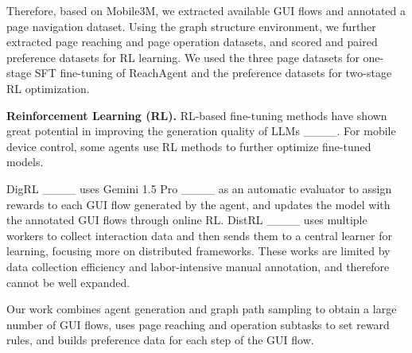 Therefore, based on Mobile3M, we extracted available GUI flows and annotated a page navigation dataset. Using the graph structure environment, we further extracted page reaching and page operation datasets, and scored and paired preference datasets for RL learning. We used the three page datasets for one-stage SFT fine-tuning of ReachAgent and the preference datasets for two-stage RL optimization.


\textbf{Reinforcement Learning (RL).}
RL-based fine-tuning methods have shown great potential in improving the generation quality of LLMs ____. For mobile device control, some agents use RL methods to further optimize fine-tuned models. 

DigRL ____ uses Gemini 1.5 Pro ____ as an automatic evaluator to assign rewards to each GUI flow generated by the agent, and updates the model with the annotated GUI flows through online RL. DistRL ____ uses multiple workers to collect interaction data and then sends them to a central learner for learning, focusing more on distributed frameworks. These works are limited by data collection efficiency and labor-intensive manual annotation, and therefore cannot be well expanded. 

Our work combines agent generation and graph path sampling to obtain a large number of GUI flows, uses page reaching and operation subtasks to set reward rules, and builds preference data for each step of the GUI flow.